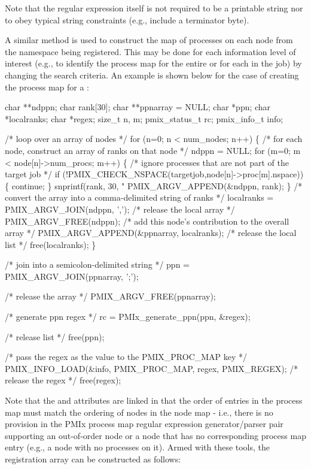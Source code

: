 Note that the regular expression itself is not required to be a printable string nor to obey typical string constraints (e.g., include a  terminator byte).

\label{cptr:api_server:ppnregex}A similar method is used to construct the map of processes on each node from the namespace being registered. This may be done for each information level of interest (e.g., to identify the process map for the entire  or for each  in the job) by changing the search criteria. An example is shown below for the case of creating the process map for a :

\cspecificstart
\begin{codepar}
char **ndppn;
char rank[30];
char **ppnarray = NULL;
char *ppn;
char *localranks;
char *regex;
size_t n, m;
pmix_status_t rc;
pmix_info_t info;

/* loop over an array of nodes */
for (n=0; n < num_nodes; n++) \{
    /* for each node, construct an array of ranks on that node */
    ndppn = NULL;
    for (m=0; m < node[n]->num_procs; m++) \{
        /* ignore processes that are not part of the target job */
        if (!PMIX_CHECK_NSPACE(targetjob,node[n]->proc[m].nspace)) \{
            continue;
        \}
        snprintf(rank, 30, "%
        PMIX_ARGV_APPEND(&ndppn, rank);
    \}
    /* convert the array into a comma-delimited string of ranks */
    localranks = PMIX_ARGV_JOIN(ndppn, ',');
    /* release the local array */
    PMIX_ARGV_FREE(ndppn);
    /* add this node's contribution to the overall array */
    PMIX_ARGV_APPEND(&ppnarray, localranks);
    /* release the local list */
    free(localranks);
\}

/* join into a semicolon-delimited string */
ppn = PMIX_ARGV_JOIN(ppnarray, ';');

/* release the array */
PMIX_ARGV_FREE(ppnarray);

/* generate ppn regex */
rc = PMIx_generate_ppn(ppn, &regex);

/* release list */
free(ppn);

/* pass the regex as the value to the PMIX_PROC_MAP key */
PMIX_INFO_LOAD(&info, PMIX_PROC_MAP, regex, PMIX_REGEX);
/* release the regex */
free(regex);
\end{codepar}
\cspecificend

Note that the  and  attributes are linked in that the order of entries in the process map must match the ordering of nodes in the node map - i.e., there is no provision in the \ac{PMIx} process map regular expression generator/parser pair supporting an out-of-order node or a node that has no corresponding process map entry (e.g., a node with no processes on it). Armed with these tools, the registration  array can be constructed as follows:

